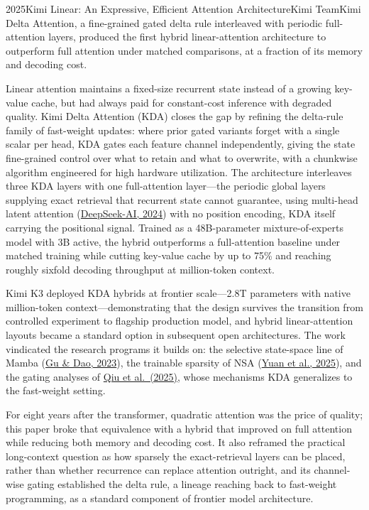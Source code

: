 
\begin{papersummary}{2025}{Kimi Linear: An Expressive, Efficient Attention Architecture}{Kimi Team}{Kimi Delta Attention, a fine-grained gated delta rule interleaved with periodic full-attention layers, produced the first hybrid linear-attention architecture to outperform full attention under matched comparisons, at a fraction of its memory and decoding cost.}

Linear attention maintains a fixed-size recurrent state instead of a growing key-value cache, but had always paid for constant-cost inference with degraded quality. Kimi Delta Attention (KDA) closes the gap by refining the delta-rule family of fast-weight updates: where prior gated variants forget with a single scalar per head, KDA gates each feature channel independently, giving the state fine-grained control over what to retain and what to overwrite, with a chunkwise algorithm engineered for high hardware utilization. The architecture interleaves three KDA layers with one full-attention layer---the periodic global layers supplying exact retrieval that recurrent state cannot guarantee, using multi-head latent attention (\hyperref[paper:deepseek-2024-v2]{DeepSeek-AI, 2024}) with no position encoding, KDA itself carrying the positional signal. Trained as a 48B-parameter mixture-of-experts model with 3B active, the hybrid outperforms a full-attention baseline under matched training while cutting key-value cache by up to 75\% and reaching roughly sixfold decoding throughput at million-token context.

Kimi K3 deployed KDA hybrids at frontier scale---2.8T parameters with native million-token context---demonstrating that the design survives the transition from controlled experiment to flagship production model, and hybrid linear-attention layouts became a standard option in subsequent open architectures. The work vindicated the research programs it builds on: the selective state-space line of Mamba (\hyperref[paper:gu-dao-2023]{Gu \& Dao, 2023}), the trainable sparsity of NSA (\hyperref[paper:yuan-2025-nsa]{Yuan et al., 2025}), and the gating analyses of \hyperref[paper:qiu-2025-gated-attention]{Qiu et al.\ (2025)}, whose mechanisms KDA generalizes to the fast-weight setting.

For eight years after the transformer, quadratic attention was the price of quality; this paper broke that equivalence with a hybrid that improved on full attention while reducing both memory and decoding cost. It also reframed the practical long-context question as how sparsely the exact-retrieval layers can be placed, rather than whether recurrence can replace attention outright, and its channel-wise gating established the delta rule, a lineage reaching back to fast-weight programming, as a standard component of frontier model architecture.

\end{papersummary}
